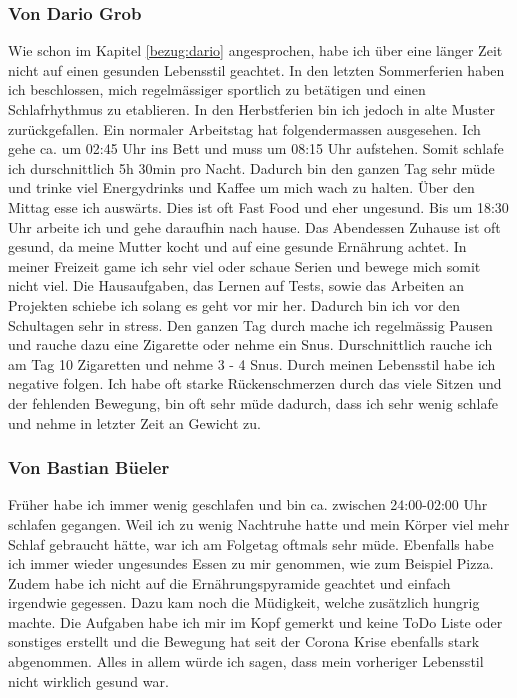 \subsubsection{Von Dario Grob}
Wie schon im Kapitel \ref{bezug:dario} angesprochen, habe ich über eine länger Zeit nicht auf einen gesunden Lebensstil geachtet. In den letzten Sommerferien haben ich beschlossen, mich regelmässiger sportlich zu betätigen und einen Schlafrhythmus zu etablieren.
\newline
In den Herbstferien bin ich jedoch in alte Muster zurückgefallen. Ein normaler Arbeitstag hat folgendermassen ausgesehen.
\newline
Ich gehe ca. um 02:45 Uhr ins Bett und muss um 08:15 Uhr aufstehen. Somit schlafe ich durschnittlich 5h 30min pro Nacht. Dadurch bin den ganzen Tag sehr müde und trinke viel Energydrinks und Kaffee um mich wach zu halten. 
\newline
Über den Mittag esse ich auswärts. Dies ist oft Fast Food und eher ungesund.
\newline
Bis um 18:30 Uhr arbeite ich und gehe daraufhin nach hause. Das Abendessen Zuhause ist oft gesund, da meine Mutter kocht und auf eine gesunde Ernährung achtet. 
\newline
In meiner Freizeit game ich sehr viel oder schaue Serien und bewege mich somit nicht viel. 
\newline
Die Hausaufgaben, das Lernen auf Tests, sowie das Arbeiten an Projekten schiebe ich solang es geht vor mir her. Dadurch bin ich vor den Schultagen sehr in stress.
\newline
Den ganzen Tag durch mache ich regelmässig Pausen und rauche dazu eine Zigarette oder nehme ein Snus. Durschnittlich rauche ich am Tag 10 Zigaretten und nehme 3 - 4 Snus.
\newline
Durch meinen Lebensstil habe ich negative folgen. Ich habe oft starke Rückenschmerzen durch das viele Sitzen und der fehlenden Bewegung, bin oft sehr müde dadurch, dass ich sehr wenig schlafe und nehme in letzter Zeit an Gewicht zu.
\subsubsection{Von Bastian Büeler}
Früher habe ich immer wenig geschlafen und bin ca. zwischen 24:00-02:00 Uhr schlafen gegangen. Weil ich zu wenig Nachtruhe hatte und mein Körper viel mehr Schlaf gebraucht hätte, war ich am Folgetag oftmals sehr müde. Ebenfalls habe ich immer wieder ungesundes Essen zu mir genommen, wie zum Beispiel Pizza. Zudem habe ich nicht auf die Ernährungspyramide geachtet und einfach irgendwie gegessen. Dazu kam noch die Müdigkeit, welche zusätzlich hungrig machte. Die Aufgaben habe ich mir im Kopf gemerkt und keine ToDo Liste oder sonstiges erstellt und die Bewegung hat seit der Corona Krise ebenfalls stark abgenommen. Alles in allem würde ich sagen, dass mein vorheriger Lebensstil nicht wirklich gesund war.
